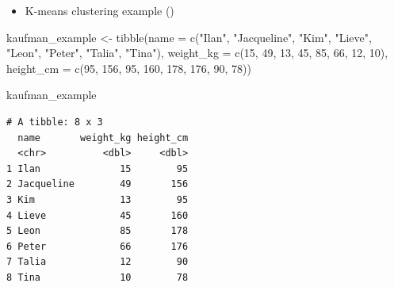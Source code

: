 \documentclass[
  ignorenonframetext,
]{beamer}
\newenvironment{Shaded}{\begin{snugshade}}{\end{snugshade}}
\newcommand{\AttributeTok}[1]{\textcolor[rgb]{0.40,0.45,0.13}{#1}}
\newcommand{\DecValTok}[1]{\textcolor[rgb]{0.68,0.00,0.00}{#1}}
\newcommand{\FunctionTok}[1]{\textcolor[rgb]{0.28,0.35,0.67}{#1}}
\newcommand{\NormalTok}[1]{\textcolor[rgb]{0.00,0.23,0.31}{#1}}
\newcommand{\OtherTok}[1]{\textcolor[rgb]{0.00,0.23,0.31}{#1}}
\newcommand{\StringTok}[1]{\textcolor[rgb]{0.13,0.47,0.30}{#1}}
\providecommand{\tightlist}{%
  \setlength{\itemsep}{0pt}\setlength{\parskip}{0pt}}\usepackage{longtable,booktabs,array}
\begin{document}
\begin{frame}[fragile]{}
\label{section-34}
\begin{itemize}
\tightlist
\item
  K-means clustering example
  ()
\end{itemize}

\tiny

\begin{Shaded}
\begin{Highlighting}[]
\NormalTok{kaufman\_example }\OtherTok{\textless{}{-}} \FunctionTok{tibble}\NormalTok{(}\AttributeTok{name =} \FunctionTok{c}\NormalTok{(}\StringTok{"Ilan"}\NormalTok{, }\StringTok{"Jacqueline"}\NormalTok{, }\StringTok{"Kim"}\NormalTok{, }\StringTok{"Lieve"}\NormalTok{, }\StringTok{"Leon"}\NormalTok{, }\StringTok{"Peter"}\NormalTok{, }\StringTok{"Talia"}\NormalTok{, }\StringTok{"Tina"}\NormalTok{),}
                          \AttributeTok{weight\_kg =} \FunctionTok{c}\NormalTok{(}\DecValTok{15}\NormalTok{, }\DecValTok{49}\NormalTok{, }\DecValTok{13}\NormalTok{, }\DecValTok{45}\NormalTok{, }\DecValTok{85}\NormalTok{, }\DecValTok{66}\NormalTok{, }\DecValTok{12}\NormalTok{, }\DecValTok{10}\NormalTok{),}
                          \AttributeTok{height\_cm =} \FunctionTok{c}\NormalTok{(}\DecValTok{95}\NormalTok{, }\DecValTok{156}\NormalTok{, }\DecValTok{95}\NormalTok{, }\DecValTok{160}\NormalTok{, }\DecValTok{178}\NormalTok{, }\DecValTok{176}\NormalTok{, }\DecValTok{90}\NormalTok{, }\DecValTok{78}\NormalTok{))}

\NormalTok{kaufman\_example}
\end{Highlighting}
\end{Shaded}

\begin{verbatim}
# A tibble: 8 x 3
  name       weight_kg height_cm
  <chr>          <dbl>     <dbl>
1 Ilan              15        95
2 Jacqueline        49       156
3 Kim               13        95
4 Lieve             45       160
5 Leon              85       178
6 Peter             66       176
7 Talia             12        90
8 Tina              10        78
\end{verbatim}
\end{frame}
\end{document}
